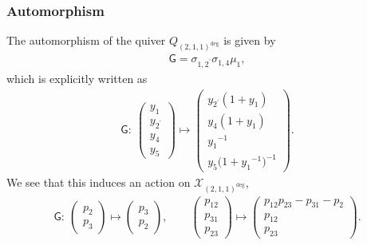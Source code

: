 \documentclass[10pt,a4paper]{amsart}
\numberwithin{equation}{section}
\begin{document}
\subsubsection*{Automorphism}
The automorphism of the quiver $Q_{(2,1,1)^{\text{deg}}}$ is given by
\begin{gather} \label{G_211deg}
 \mathsf{G} = \sigma_{1,2^\prime} \sigma_{1,4} \mu_1 ,
\end{gather}
which is explicitly written as
\begin{gather*}
 \mathsf{G} \colon \
 \begin{pmatrix}
 y_1 \\ y_{2^\prime} \\ y_4 \\ y_5
 \end{pmatrix}
 \mapsto
 \begin{pmatrix}
 y_{2^\prime} ( 1 + y_1 ) \\
 y_4 ( 1 + y_1 ) \\
 {y_1}^{-1} \\
 y_5 \big( 1+{y_{1}}^{-1} \big)^{-1}
 \end{pmatrix} .
\end{gather*}
We see that this induces an action on $\mathcal{X}_{(2,1,1)^{\text{deg}}}$,
\begin{gather*}
 \mathsf{G} \colon \
 \begin{pmatrix}
 p_2 \\ p_3
 \end{pmatrix}
 \mapsto
 \begin{pmatrix}
 p_3 \\ p_2
 \end{pmatrix} ,
 \qquad
 \begin{pmatrix}
 p_{12} \\ p_{31} \\ p_{23}
 \end{pmatrix}
 \mapsto
 \begin{pmatrix}
 p_{12} p_{23} - p_{31} - p_2 \\
 p_{12} \\
 p_{23}
 \end{pmatrix} .
\end{gather*}
\end{document}
